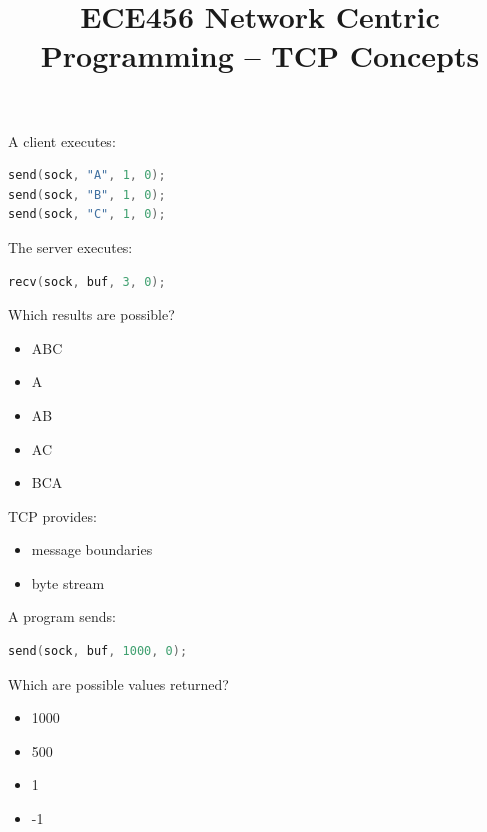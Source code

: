 

\title{ECE456 Network Centric Programming -- TCP Concepts}
\date{}
\author{}



\maketitle

\begin{questions}

	\question[8]

	A client executes:

	\begin{lstlisting}[language=C]
send(sock, "A", 1, 0);
send(sock, "B", 1, 0);
send(sock, "C", 1, 0);
\end{lstlisting}

	The server executes:

	\begin{lstlisting}[language=C]
recv(sock, buf, 3, 0);
\end{lstlisting}

	Which results are possible?

	\begin{itemize}
		\item ABC
		\item A
		\item AB
		\item AC
		\item BCA
	\end{itemize}

	\question[8]

	TCP provides:

	\begin{itemize}
		\item message boundaries
		\item byte stream
	\end{itemize}

	\question[10]

	A program sends:

	\begin{lstlisting}[language=C]
send(sock, buf, 1000, 0);
\end{lstlisting}

	Which are possible values returned?

	\begin{itemize}
		\item 1000
		\item 500
		\item 1
		\item -1
	\end{itemize}


\end{questions}
